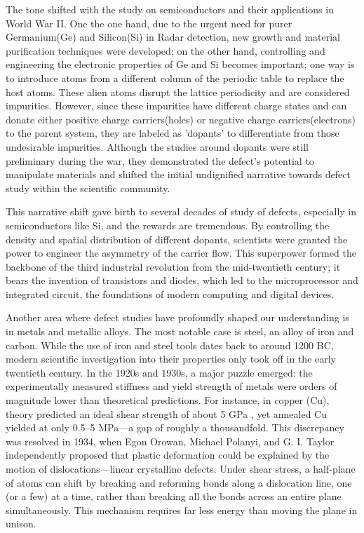 The tone shifted with the study on semiconductors and their applications in World War II. One the one hand, due to the urgent need for purer Germanium(Ge) and Silicon(Si) in Radar detection, new growth and material purification techniques were developed; on the other hand, controlling and engineering the electronic properties of Ge and Si becomes important; one way is to introduce atoms from a different column of the periodic table to replace the host atoms. These alien atoms disrupt the lattice periodicity and are considered impurities. However, since these impurities have different charge states and can donate either positive charge carriers(holes) or negative charge carriers(electrons) to the parent system, they are labeled as 'dopants' to differentiate from those undesirable impurities. Although the studies around dopants were still preliminary during the war, they demonstrated the defect's potential to manipulate materials and shifted the initial undignified narrative towards defect study within the scientific community.

This narrative shift gave birth to several decades of study of defects, especially in semiconductors like Si, and the rewards are tremendous. By controlling the density and spatial distribution of different dopants, scientists were granted the power to engineer the asymmetry of the carrier flow. This superpower formed the backbone of the third industrial revolution from the mid-twentieth century; it bears the invention of transistors and diodes, which led to the microprocessor and integrated circuit, the foundations of modern computing and digital devices.   

Another area where defect studies have profoundly shaped our understanding is in metals and metallic alloys. The most notable case is steel, an alloy of iron and carbon. While the use of iron and steel tools dates back to around 1200 BC, modern scientific investigation into their properties only took off in the early twentieth century. In the 1920s and 1930s, a major puzzle emerged: the experimentally measured stiffness and yield strength of metals were orders of magnitude lower than theoretical predictions. For instance, in copper (Cu), theory predicted an ideal shear strength of about 5 GPa \cite{frenkelZurTheorieElastizitaetsgrenze1926}, yet annealed Cu yielded at only 0.5–5 MPa—a gap of roughly a thousandfold. This discrepancy was resolved in 1934, when Egon Orowan, Michael Polanyi, and G. I. Taylor independently proposed that plastic deformation could be explained by the motion of dislocations—linear crystalline defects. Under shear stress, a half-plane of atoms can shift by breaking and reforming bonds along a dislocation line, one (or a few) at a time, rather than breaking all the bonds across an entire plane simultaneously. This mechanism requires far less energy than moving the plane in unison.

